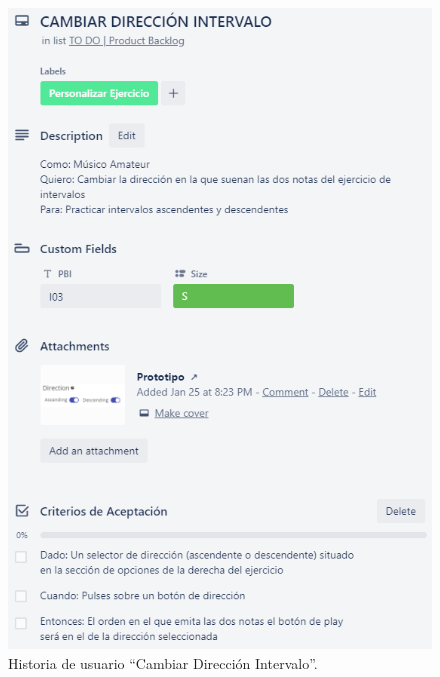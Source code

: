 \documentclass[12pt,twoside,titlepage]{report}
\begin{document}
{\begin{figure}[H]
    \centering
    \includegraphics[scale=1.3]{Scrum/User Stories/IntervalosDireccion}
    \caption{Historia de usuario ``Cambiar Dirección Intervalo''.}
    \label{fig:IntervalosDireccion}
\end{figure}

}
\end{document}
